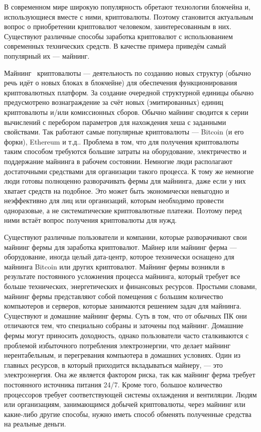 \label{sec:introduction}

В современном мире широкую популярность обретают технологии блокчейна и, использующиеся вместе с ними, криптовалюты. Поэтому становится актуальным вопрос о приобретении криптовалют человеком, заинтересованным в них. Существуют различные способы заработка криптовалют с использованием современных технических средств. В качестве примера приведём самый популярный их — майнинг.

Майнинг~\cite{wiki_mine} криптовалюты — деятельность по созданию новых структур (обычно речь идёт о новых блоках в блокчейне) для обеспечения функционирования криптовалютных платформ. За создание очередной структурной единицы обычно предусмотрено вознаграждение за счёт новых (эмитированных) единиц криптовалюты и/или комиссионных сборов. Обычно майнинг сводится к серии вычислений с перебором параметров для нахождения хеша с заданными свойствами. Так работают самые популярные криптовалюты — Bitcoin (и его форки), Ethereum и т.д.. Проблема в том, что для получения криптовалюты таким способом требуются большие затраты на оборудование, электричество и поддержание майнинга в рабочем состоянии. Немногие люди располагают достаточными средствами для организации такого процесса. К тому же немногие люди готовы полноценно разворачивать фермы для майнинга, даже если у них хватает средств на подобное. Это может быть экономически невыгодно и неэффективно для лиц или организаций, которым необходимо провести одноразовые, а не систематические криптовалютные платежи. Поэтому перед ними встаёт вопрос получения криптовалюты для нужд.

Существуют различные пользователи и компании, которые разворачивают свои майнинг фермы для заработка криптовалют.
Майнер или майнинг ферма — оборудование, иногда целый дата-центр, которое технически оснащено для майнинга Bitcoin или других криптовалют. Майнинг фермы возникли в результате постоянного усложнения процесса майнинга, который требует все больше технических, энергетических и финансовых ресурсов. 
Простыми словами, майнинг фермы представляют собой помещения с большим количество компьютеров и серверов, которые занимаются решением задач для майнинга.
Существуют и домашние майнинг фермы. Суть в том, что от обычных ПК они отличаются тем, что специально собраны и заточены под майнинг. Домашние фермы могут приносить доходность, однако пользователи часто сталкиваются с проблемой избыточного потребления электроэнергии, что делает майнинг нерентабельным, и перегревания компьютера в домашних условиях.
Один из главных ресурсов, в который приходится вкладываться майнеру, — это электроэнергия. Она же является фактором риска, так как майнинг ферма требует постоянного источника питания 24/7. Кроме того, большое количество процессоров требует соответствующей системы охлаждения и вентиляции.  
Людям или организациям, занимающимся добычей криптовалюты, через майнинг или какие-либо другие способы, нужно иметь способ обменять полученные средства на реальные деньги.

